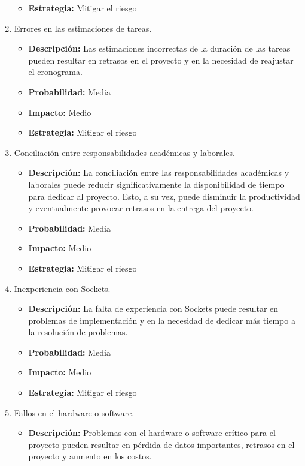 \begin{enumerate}
\begin{itemize}
        \item \textbf{Estrategia:} Mitigar el riesgo
    \end{itemize}
    \item Errores en las estimaciones de tareas.
    \begin{itemize}
        \item \textbf{Descripción:} Las estimaciones incorrectas de la duración de las tareas pueden resultar en retrasos en el proyecto y
         en la necesidad de reajustar el cronograma.
        \item \textbf{Probabilidad:} Media
        \item \textbf{Impacto:} Medio
        \item \textbf{Estrategia:} Mitigar el riesgo
    \end{itemize}
    \item Conciliación entre responsabilidades académicas y laborales.
    \begin{itemize}
        \item \textbf{Descripción:} La conciliación entre las responsabilidades académicas y laborales puede reducir significativamente la disponibilidad de tiempo para dedicar al proyecto. 
        Esto, a su vez, puede disminuir la productividad y eventualmente provocar retrasos en la entrega del proyecto.
        \item \textbf{Probabilidad:} Media
        \item \textbf{Impacto:} Medio
        \item \textbf{Estrategia:} Mitigar el riesgo
    \end{itemize}
    \item Inexperiencia con Sockets.
    \begin{itemize}
        \item \textbf{Descripción:} La falta de experiencia con Sockets puede resultar en problemas de implementación y en la necesidad de dedicar más tiempo a la resolución de problemas.
        \item \textbf{Probabilidad:} Media
        \item \textbf{Impacto:} Medio
        \item \textbf{Estrategia:} Mitigar el riesgo
    \end{itemize}
    \item Fallos en el hardware o software.
    \begin{itemize}
        \item \textbf{Descripción:} Problemas con el hardware o software crítico para el proyecto pueden resultar en pérdida de datos importantes, retrasos en el proyecto y aumento en los costos.

\end{itemize}
\end{enumerate}
